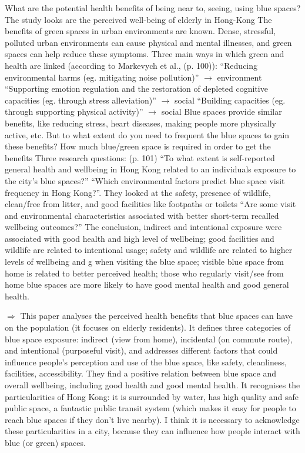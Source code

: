 \documentclass{article}
\begin{document}
\begin{outline}
	\1 What are the potential health benefits of being near to, seeing, using blue spaces? The study looks are the perceived well-being of elderly in Hong-Kong
	\1 The benefits of green spaces in urban environments are known. Dense, stressful, polluted urban environments can cause physical and mental illnesses, and green spaces can help reduce these symptoms. Three main ways in which green and health are linked (according to Markevych et al., (p. 100)):
		\2 ``Reducing environmental harms (eg. mitigating noise pollution)'' $\rightarrow$ environment
		\2 ``Supporting emotion regulation and the restoration of depleted cognitive capacities (eg. through stress alleviation)'' $\rightarrow$ social
		\2 ``Building capacities (eg. through supporting physical activity)'' $\rightarrow$ social
	\1 Blue spaces provide similar benefits, like reducing stress, heart diseases, making people more physically active, etc. But to what extent do you need to frequent the blue spaces to gain these benefits? How much blue/green space is required in order to get the benefits
	\1 Three research questions: (p. 101)
		\2 ``To what extent is self-reported general health and wellbeing in Hong Kong related to an individuals exposure to the city's blue spaces?''
		\2 ``Which environmental factors predict blue space visit frequency in Hong Kong?''. They looked at the safety, presence of wildlife, clean/free from litter, and good facilities like footpaths or toilets
		\2 ``Are some visit and environmental characteristics associated with better short-term recalled wellbeing outcomes?''
	\1 The conclusion, indirect and intentional exposure were associated with good health and high level of wellbeing; good facilities and wildlife are related to intentional usage; safety and wildlife are related to higher levels of wellbeing and g when visiting the blue space; visible blue space from home is related to better perceived health; those who regularly visit/see from home blue spaces are more likely to have good mental health and good general health.
	
	\1 $\Rightarrow$ This paper analyses the perceived health benefits that blue spaces can have on the population (it focuses on elderly residents). It defines three categories of blue space exposure: indirect (view from home), incidental (on commute route), and intentional (purposeful visit), and addresses different factors that could influence people's perception and use of the blue space, like safety, cleanliness, facilities, accessibility. They find a positive relation between blue space and overall wellbeing, including good health and good mental health.
	It recognises the particularities of Hong Kong: it is surrounded by water, has high quality and safe public space, a fantastic public transit system (which makes it easy for people to reach blue spaces if they don't live nearby). I think it is necessary to acknowledge these particularities in a city, because they can influence how people interact with blue (or green) spaces.
	

\end{outline}
\end{document}
